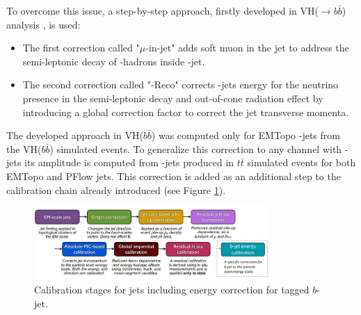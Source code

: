 To overcome this issue, a step-by-step approach, firstly developed in VH($\rightarrow b\bar{b}$) analysis \cite{Vhbb}, is used:
\begin{itemize}
    \item The first correction called "$\mu$-in-jet" adds soft muon in the jet to address the semi-leptonic decay of \bq-hadrons inside \bq-jet.
    \item The second correction called "\pT-Reco" corrects \bq-jets energy for the neutrino presence in the semi-leptonic decay and out-of-cone radiation effect by introducing a global correction factor to correct the jet transverse momenta.
\end{itemize}
 The developed approach in VH($b\bar{b}$) was computed only for EMTopo \bq-jets from the VH($b\bar{b}$) simulated events. To generalize this correction to any channel with \bq-jets its amplitude is computed from \bq-jets produced in $t\bar{t}$ simulated events for both EMTopo and PFlow jets. This correction is added as an additional step to the calibration chain already introduced (see Figure \ref{fig:Jet:Cal:BCal:Chain}).
\begin{figure}[htbp]
    \centering
    \includegraphics[width=0.8\textwidth]{Ch4/Img/b_jet_chain.png}
    \begin{tcolorbox}[colback=black!5!white,colframe=white!75!black]
    \caption{Calibration stages for jets including energy correction for tagged $b$-jet.}
    \label{fig:Jet:Cal:BCal:Chain}
    \end{tcolorbox}
\end{figure}


